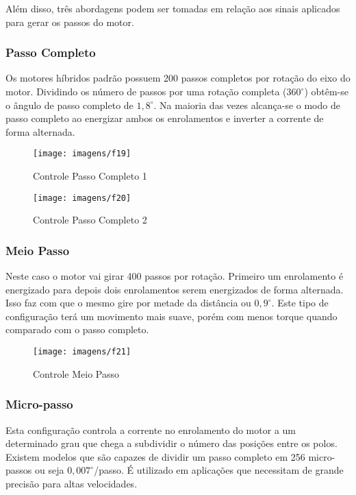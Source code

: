 Além disso, três abordagens podem ser tomadas em relação aos sinais aplicados para gerar os passos do motor.

\subsubsection{Passo Completo}

Os motores híbridos padrão possuem 200 passos completos por rotação do eixo do motor. Dividindo os número de passos por uma rotação completa ($360^{\circ}$) obtêm-se o ângulo de passo completo de $1,8^{\circ}$. Na maioria das vezes alcança-se o modo de passo completo ao energizar ambos os enrolamentos e inverter a corrente de forma alternada. 

\begin{figure}[ht!]
    \center 
    \texttt{[image: imagens/f19]}
    \caption{Controle Passo Completo 1}
\end{figure}


\begin{figure}[ht!]
    \center 
    \texttt{[image: imagens/f20]}
    \caption{Controle Passo Completo 2}
\end{figure}
    
\subsubsection{Meio Passo}

Neste caso o motor vai girar 400 passos por rotação. Primeiro um enrolamento é energizado para depois dois enrolamentos serem energizados de forma alternada. Isso faz com que o mesmo gire por metade da distância ou $0,9^{\circ}$. Este tipo de configuração terá um movimento mais suave, porém com menos torque quando comparado com o passo completo. 

\begin{figure}[ht!]
    \center 
    \texttt{[image: imagens/f21]}
    \caption{Controle Meio Passo}
\end{figure}
    
\subsubsection{Micro-passo}

Esta configuração controla a corrente no enrolamento do motor a um determinado grau que chega a subdividir o número das posições entre os polos. Existem modelos que são capazes de dividir um passo completo em 256 micro-passos ou seja $0,007^{\circ}$/passo. É utilizado em aplicações que necessitam de grande precisão para altas velocidades.

